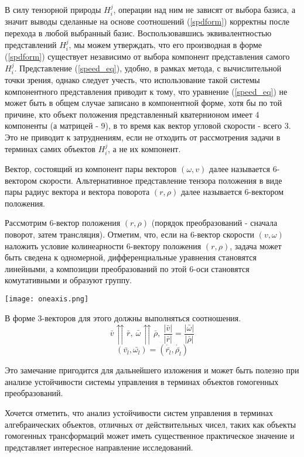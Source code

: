 В силу тензорной природы $H^j_i$, операции над ним не зависят от выбора базиса, а значит выводы сделанные на основе соотношений (\ref{spdform}) корректны после перехода в любой выбранный базис. Воспользовавшись эквивалентностью представлений $H^j_i$, мы можем утверждать, что его производная в форме (\ref{spdform}) существует независимо от выбора компонент представления самого $H^j_i$. Представление (\ref{speed_eq}), удобно, в рамках метода, с вычислительной точки зрения, однако следует учесть, что использование такой системы компонентного представления приводит к тому, что уравнение (\ref{speed_eq}) не может быть в общем случае записано в компонентной форме, хотя бы по той причине, кто объект положения представленный кватернионом имеет 4 компоненты (а матрицей - 9), в то время как вектор угловой скорости - всего 3. Это не приводит к затруднениям, если не отходить от рассмотрения задачи в терминах самих объектов $H^j_i$, а не их компонент.

Вектор, состоящий из компонент пары векторов $(\omega, v)$ далее называется 6-вектором скорости. Альтернативное представление тензора положения в виде пары радиус вектора и вектора поворота $(r,\rho)$ далее называется 6-вектором положения.

Рассмотрим 6-вектор положения $(r,\rho)$ (порядок преобразований - сначала поворот, затем трансляция). Отметим, что, если на 6-вектор скорости $(v,\omega)$ наложить условие колинеарности 6-вектору положения $(r,\rho)$, задача может быть сведена к одномерной, дифференциальные уравнения становятся линейными, а композиции преобразований по этой 6-оси становятся комутативными и образуют группу. 
\begin{center}
  \texttt{[image: oneaxis.png]}
  \label{}
\end{center}

В форме 3-векторов для этого должны выполняться соотношения.
\begin{equation}\label{} 
\bar{v} \upuparrows \bar{r}, \  \bar{\omega} \upuparrows \bar{\rho}, \  \frac{|\bar{v}|}{|\bar{r}|} = \frac{|\bar{\omega}|}{|\bar{\rho}|} 
\end{equation}
\begin{equation}
(\bar{v_l},\bar{\omega_l}) = (\dot{\bar{r_l}},\dot{\bar{\rho_l}})
\end{equation}

Это замечание пригодится для дальнейшего изложения и может быть полезно при анализе устойчивости системы управления в терминах объектов гомогенных преобразований. 

Хочется отметить, что анализ устойчивости систем управления в терминах алгебраических объектов, отличных от действительных чисел, таких как объекты гомогенных трансформаций может иметь существенное практическое значение и представляет интересное направление исследований.